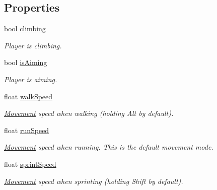 \subsection*{Properties}
\begin{DoxyCompactItemize}
\item 
bool \mbox{\hyperlink{class_lua_1_1_player_entity_ae050a6ac5d73748b2e989b3b3fbfd61d}{climbing}}
\begin{DoxyCompactList}\small\item\em Player is climbing. \end{DoxyCompactList}\item 
bool \mbox{\hyperlink{class_lua_1_1_player_entity_ae805d9b6fbe0ecb483f726fee471434f}{is\+Aiming}}
\begin{DoxyCompactList}\small\item\em Player is aiming. \end{DoxyCompactList}\item 
float \mbox{\hyperlink{class_lua_1_1_player_entity_aabbfb4d83476aaa301ee4f526dd6ecf8}{walk\+Speed}}
\begin{DoxyCompactList}\small\item\em \mbox{\hyperlink{class_lua_1_1_movement}{Movement}} speed when walking (holding {\ttfamily Alt} by default). \end{DoxyCompactList}\item 
float \mbox{\hyperlink{class_lua_1_1_player_entity_a3b78a546178fca04a5bfd04159bebe51}{run\+Speed}}
\begin{DoxyCompactList}\small\item\em \mbox{\hyperlink{class_lua_1_1_movement}{Movement}} speed when running. This is the default movement mode. \end{DoxyCompactList}\item 
float \mbox{\hyperlink{class_lua_1_1_player_entity_acd890123e850bbd3c1e4e459b65ea5c1}{sprint\+Speed}}
\begin{DoxyCompactList}\small\item\em \mbox{\hyperlink{class_lua_1_1_movement}{Movement}} speed when sprinting (holding {\ttfamily Shift} by default). \end{DoxyCompactList}\item 

\end{DoxyCompactItemize}
